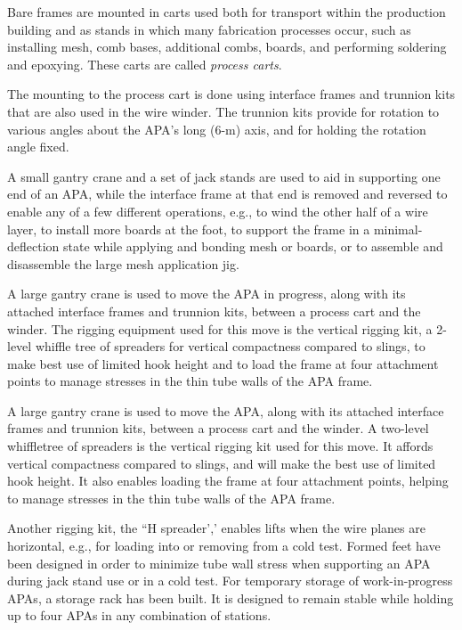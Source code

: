 Bare frames are mounted in carts used both for transport within the production building and as stands in which many fabrication processes occur, such as installing mesh, comb bases, additional combs, boards, and performing soldering and epoxying. These carts are called \textit{process carts}. 

The mounting to the process cart is done using interface frames and trunnion kits that are also used in the wire winder. The trunnion kits provide for rotation to various angles about the APA's long (6-m) axis, and for holding the rotation angle fixed. 

A small gantry crane and a set of jack stands are used to aid in supporting one end of an APA, while the interface frame at that end is removed and reversed to enable any of a few different operations, e.g., to wind the other half of a wire layer, %
to install more boards at the foot, to support the frame in a minimal-deflection state while applying and bonding mesh or boards, or to assemble and disassemble the large mesh application jig. 

A large gantry crane is used to move the APA in progress, along with its attached interface frames and trunnion kits, between a process cart and the winder. The rigging equipment used for this move is the vertical rigging kit, a 2-level whiffle tree of spreaders for vertical compactness compared to slings, to make best use of limited hook height and to load the frame at four attachment points to manage stresses in the thin tube walls of the APA frame. 

A large gantry crane is used to move the APA, along with its attached interface frames and trunnion kits, between a process cart and the winder. A two-level whiffletree of spreaders is the vertical rigging kit used for this move.  It affords vertical compactness compared to slings, and will make the best use of limited hook height. It also enables loading the frame at four attachment points, helping to manage stresses in the thin tube walls of the APA frame. 

Another rigging kit, the ``H spreader',' enables lifts when the wire planes are horizontal, e.g., for loading into or removing from a cold test. Formed feet have been designed %
in order to minimize tube wall stress when supporting an APA during jack stand use or in a cold test. For temporary storage of work-in-progress APAs, a storage rack has been built. It is designed to remain stable while holding up to four APAs in any combination of stations. %

